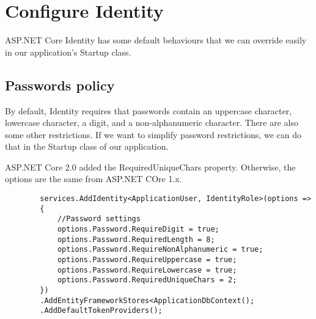 \documentclass{report}
\begin{document}
    \chapter{Configure Identity}
    ASP.NET Core Identity has some default behaviours that we can override easily in our application's Startup class.

    \section{Passwords policy}
    By default, Identity requires that passwords contain an uppercase character, lowercase character, a digit, and a non-alphanumeric character. There are also some other restrictions. If we want to simplify password restrictions, we can do that in the Startup class of our application.

    ASP.NET Core 2.0 added the RequiredUniqueChars property. Otherwise, the options are the same from ASP.NET COre 1.x.
    \lstset{style=sharpc}
    \begin{lstlisting}
        services.AddIdentity<ApplicationUser, IdentityRole>(options =>
        {
            //Password settings
            options.Password.RequireDigit = true;
            options.Password.RequiredLength = 8;
            options.Password.RequireNonAlphanumeric = true;
            options.Password.RequireUppercase = true;
            options.Password.RequireLowercase = true;
            options.Password.RequiredUniqueChars = 2;
        })
        .AddEntityFrameworkStores<ApplicationDbContext();
        .AddDefaultTokenProviders();
    \end{lstlisting}
\end{document}
